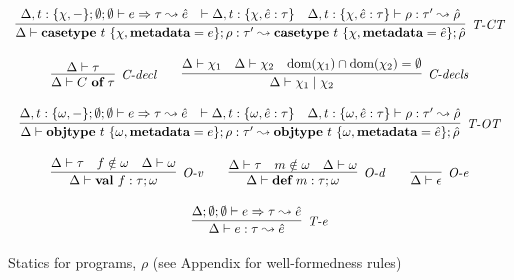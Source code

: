 

\begin{figure}[t]
\centering
\[
\begin{array}{c}
\infer[\textit{T-CT}]
          {%
	    \Delta \vdash  \keyw{casetype}~ t~\{\chi, \keyw{metadata}=e\}; \rho :\tau' \leadsto %
            \keyw{casetype}~ t~\{\chi, \keyw{metadata}=\hat{e}\};\hat{\rho}
       }
	  {\Delta, t:\{\chi,-\}; \emptyset; \emptyset \vdash e \Rightarrow \tau \leadsto \hat{e} & \vdash \Delta, t:\{\chi,\hat{e} : \tau\} & \Delta, t:\{\chi, \hat e:\tau\} \vdash \rho :\tau'\leadsto \hat{\rho} }
	   \\[3ex] 
	   
\infer[\textit{C-decl}]
	{\Delta \vdash  C~\keyw{of}~\tau} 
	{\Delta \vdash \tau   }
~~~~~~
\infer[\textit{C-decls}]
	{\Delta \vdash  \chi_1 \bnfalt \chi_2} 
	{\Delta \vdash \chi_1 & \Delta \vdash \chi_2 & \text{dom}(\chi_1) \intersect \text{dom}(\chi_2) = \emptyset}\\[3ex]

\infer[\textit{T-OT}]
          {%
	    \Delta \vdash  \keyw{objtype}~ t~\{{\omega}, \keyw{metadata}=e\}; \rho: \tau'\leadsto%
            \keyw{objtype}~ t~\{{\omega}, \keyw{metadata}=\hat{e}\}; \hat{\rho}
       }
	  {\Delta, t:\{\omega,-\}; \emptyset; \emptyset \vdash e \Rightarrow \tau \leadsto \hat{e} & \vdash \Delta, t:\{\omega,\hat{e} : \tau\} & \Delta, t:\{\omega, \hat e:\tau\} \vdash \rho :\tau'\leadsto \hat{\rho} }
	   \\[3ex] 
\infer[\textit{O-v}]
	{\Delta \vdash \keyw{val}~ f:\tau; \omega }
	{\Delta \vdash \tau & f \notin \omega & \Delta \vdash \omega }
~~~~~~	
\infer[\textit{O-d}]
	{\Delta \vdash \keyw{def}~ m:\tau; \omega }
	{\Delta \vdash \tau & m \notin \omega & \Delta \vdash \omega }
~~~~~~
\infer[\textit{O-e}]
	{\Delta \vdash \epsilon}
	{ }\\[3ex]

\infer[\textit{T-e}]
	{\Delta \vdash  e:\tau \leadsto \hat{e}} 
	{\Delta; \emptyset; \emptyset \vdash e \Rightarrow \tau \leadsto \hat{e}}
\end{array}
\]
\vspace{-15px}
\caption{Statics for programs, $\rho$ (see Appendix for well-formedness rules)}
\vspace{-15px}
\end{figure}
